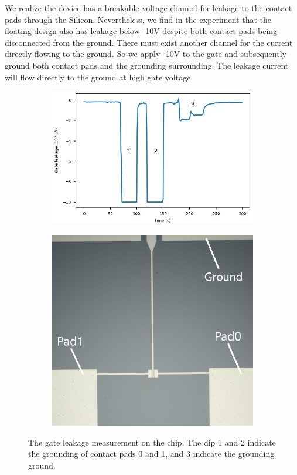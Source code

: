 We realize the device has a breakable voltage channel for leakage to the contact pads through the Silicon. Nevertheless, we find in the experiment that the floating design also has leakage below -10V despite both contact pads being disconnected from the ground. There must exist another channel for the current directly flowing to the ground. So we apply -10V to the gate and subsequently ground both contact pads and the grounding surrounding. The leakage current will flow directly to the ground at high gate voltage.  
\begin{figure}[h!]
    \centering
    \begin{subfigure}[b]{0.58\textwidth}
         \centering
         \includegraphics[width=\textwidth]{Pic/Gate_leak.jpg}
         \caption{}
         \label{}
     \end{subfigure}
     \hfill
     \begin{subfigure}[b]{0.4\textwidth}
         \centering
         \includegraphics[width=\textwidth]{Pic/GateTest_overview.png}
         \caption{}
         \label{}
     \end{subfigure}
    \caption{The gate leakage measurement on the chip. The dip 1 and 2 indicate the grounding of contact pads 0 and 1, and 3 indicate the grounding ground.}
    \label{fig:my_label}
\end{figure}
